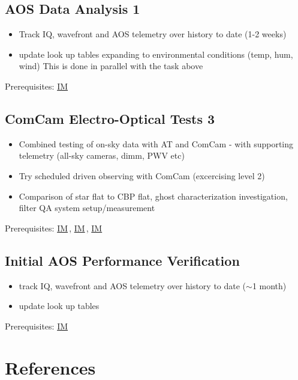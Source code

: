 \documentclass[SE,authoryear,toc]{lsstdoc}
\newcommand{\IM}[1]{\hyperref[IM:#1]{\color{blue}IM$_{\text{\csname nameIM#1\endcsname}}$}}
\begin{document}
\subsection{AOS Data Analysis 1}

\begin{itemize}
\item Track IQ, wavefront and AOS telemetry over history to date (1-2 weeks)
\item update look up tables expanding to environmental conditions (temp, hum, wind)
  This is done in parallel with the task above
\end{itemize}
Prerequisites: \IM{b}

\subsection{ComCam Electro-Optical Tests 3}

\begin{itemize}
\item Combined testing of on-sky data with AT and ComCam - with supporting telemetry (all-sky cameras, dimm, PWV etc)
\item Try scheduled driven observing with ComCam (excercising level 2)
\item Comparison of star flat to CBP flat, ghost characterization investigation, filter QA system setup/measurement
\end{itemize}
Prerequisites: \IM{b}, \IM{g}, \IM{cbp}

\subsection{Initial AOS Performance Verification}

\begin{itemize}
\item track IQ, wavefront and AOS telemetry over history to date ($\sim$1 month)
\item update look up tables
\end{itemize}
Prerequisites: \IM{b}

\section{References} \label{sec:bib}
\renewcommand{\refname}{} %


%
\printglossaries
\end{document}
